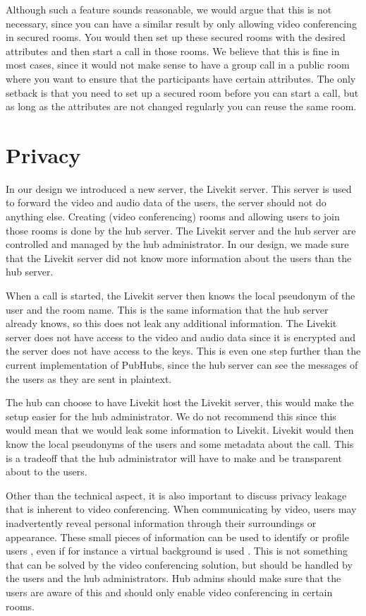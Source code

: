 \documentclass{report}
\begin{document}
Although such a feature sounds reasonable, we would argue that this is not necessary, since you can have a similar
result by only allowing video conferencing in secured rooms. You would then set up these secured rooms with the
desired attributes and then start a call in those rooms. We believe that this is fine in most cases, since it would
not make sense to have a group call in a public room where you want to ensure that the participants have certain attributes.
The only setback is that you need to set up a secured room before you can start a call, but as long as the attributes
are not changed regularly you can reuse the same room.

\section{Privacy}
In our design we introduced a new server, the Livekit server. This server is used to forward the video and audio data
of the users, the server should not do anything else. Creating (video conferencing) rooms and allowing users to join
those rooms is done by the hub server. The Livekit server and the hub server are controlled and managed by the hub
administrator. In our design, we made sure that the Livekit server did not know more information about the users
than the hub server.

When a call is started, the Livekit server then knows the local pseudonym of the user and the room name. This is the
same information that the hub server already knows, so this does not leak any additional information. The Livekit server
does not have access to the video and audio data since it is encrypted and the server does not have access to the keys.
This is even one step further than the current implementation of PubHubs, since the hub server can see the messages of
the users as they are sent in plaintext.

The hub can choose to have Livekit host the Livekit server, this would make the setup easier for the hub administrator.
We do not recommend this since this would mean that we would leak some information to Livekit. Livekit would then know
the local pseudonyms of the users and some metadata about the call. This is a tradeoff that the hub administrator will
have to make and be transparent about to the users.

Other than the technical aspect, it is also important to discuss privacy leakage that is inherent to video conferencing.
When communicating by video, users may inadvertently reveal personal information through their surroundings or
appearance. These small pieces of information can be used to identify or profile users \cite{kagan_zooming_2024},
even if for instance a virtual background is used \cite{hilgefort_spying_2021}. This is not something that can be solved by the video conferencing solution, but
should be handled by the users and the hub administrators. Hub admins should make sure that the users are aware of
this and should only enable video conferencing in certain rooms.
\end{document}
